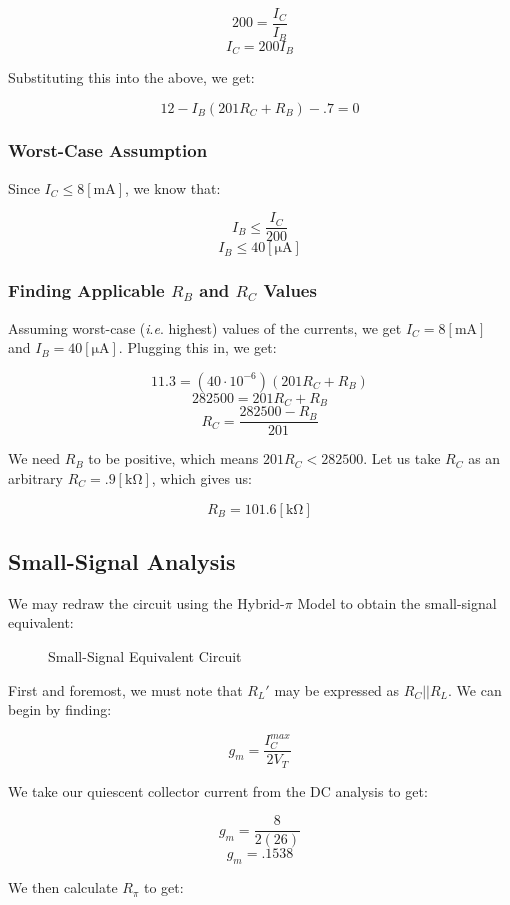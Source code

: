 \documentclass[
	letterpaper, %
	10pt, %
]{CSUniSchoolLabReport}
\begin{document}
$$200=\frac{I_C}{I_B}$$
$$I_C=200I_B$$

Substituting this into the above, we get:

$$12-I_B(201R_C+R_B)-.7=0$$

\subsubsection{Worst-Case Assumption}

Since $I_C\leq 8[\si{\milli\ampere}]$, we know that:

$$I_B\leq \frac{I_C}{200}$$
$$I_B\leq 40[\si{\micro\ampere}]$$

\subsubsection{Finding Applicable $R_B$ and $R_C$ Values}

Assuming worst-case (\textit{i}.\textit{e}. highest) values of the currents, we get $I_C=8[\si{\milli\ampere}]$ and $I_B=40[\si{\micro\ampere}]$. Plugging this in, we get:

$$11.3=(40\cdot10^{-6})(201R_C+R_B)$$
$$282500=201R_C+R_B$$
$$\boxed{R_C=\frac{282500-R_B}{201}}$$

We need $R_B$ to be positive, which means $201R_C<282500$. Let us take $R_C$ as an arbitrary $\boxed{R_C=.9[\si{\kilo\ohm}]}$, which gives us:

$$\boxed{R_B=101.6[\si{\kilo\ohm}]}$$

\subsection{Small-Signal Analysis}

We may redraw the circuit using the Hybrid-$\pi$ Model to obtain the small-signal equivalent:

\begin{figure}[H]
  \centering
  
  \caption{Small-Signal Equivalent Circuit}
  \label{fig:3}
\end{figure}

First and foremost, we must note that $R_L'$ may be expressed as $R_C||R_L$. We can begin by finding:

$$g_m=\frac{I_{C}^{max}}{2V_T}$$

We take our quiescent collector current from the DC analysis to get:

$$g_m=\frac{8}{2(26)}$$
$$\boxed{g_m=.1538}$$

We then calculate $R_{\pi}$ to get:
\end{document}
